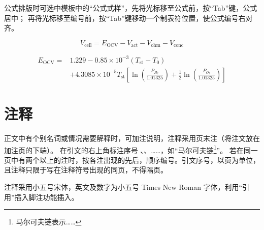 公式排版时可选中模板中的“公式式样”，先将光标移至公式前，按“Tab”键，公式居中；
再将光标移至编号前，按“Tab”键移动一个制表符位置，使公式编号右对齐。

\begin{equation}
  V_{\text{cell}} = E_{\text{OCV}} - V_{\text{act}} - V_{\text{ohm}} - V_{\text{conc}}
\end{equation}

\begin{equation}
  \begin{aligned}
    E_{\text{OCV}} ={}& 1.229 - 0.85 \times 10^{-3}(T_{\text{st}} - T_0) \\
    & + 4.3085 \times 10^{-5} T_{\text{st}}
    \left[
      \ln \left( \frac{P_{H_2}}{1.01325} \right)
      + \frac{1}{2}\ln \left( \frac{P_{O_2}}{1.01325} \right)
    \right]
  \end{aligned}
\end{equation}

\section{注释}

正文中有个别名词或情况需要解释时，可加注说明，注释采用页末注（将注文放在加注页的下端）。
在引文的右上角标注序号 、、……，如“马尔可夫链\footnote{马尔可夫链表示……}”。
若在同一页中有两个以上的注时，按各注出现的先后，顺序编号。引文序号，以页为单位，
且注释只限于写在注释符号出现的同页，不得隔页。

注释采用小五号宋体，英文及数字为小五号 Times New Roman 字体，利用“引用”插入脚注功能插入。
